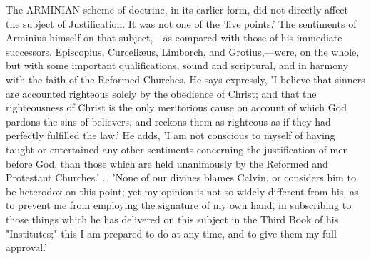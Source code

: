 \documentclass[
]{book}
\begin{document}
The ARMINIAN scheme of doctrine, in its earlier form, did not directly affect the subject of Justification. It was not one of the 'five points.' The sentiments of Arminius himself on that subject,---as compared with those of his immediate successors, Episcopius, Curcellæus, Limborch, and Grotius,---were, on the whole, but with some important qualifications, sound and scriptural, and in harmony with the faith of the Reformed Churches. He says expressly, 'I believe that sinners are accounted righteous solely by the obedience of Christ; and that the righteousness of Christ is the only meritorious cause on account of which God pardons the sins of believers, and reckons them as righteous as if they had perfectly fulfilled the law.' He adds, 'I am not conscious to myself of having taught or entertained any other sentiments concerning the justification of men before God, than those which are held unanimously by the Reformed and Protestant Churches.' \ldots{} 'None of our divines blames Calvin, or considers him to be heterodox on this point; yet my opinion is not so widely different from his, as to prevent me from employing the signature of my own hand, in subscribing to those things which he has delivered on this subject in the Third Book of his "Institutes;" this I am prepared to do at any time, and to give them my full approval.'
\end{document}
